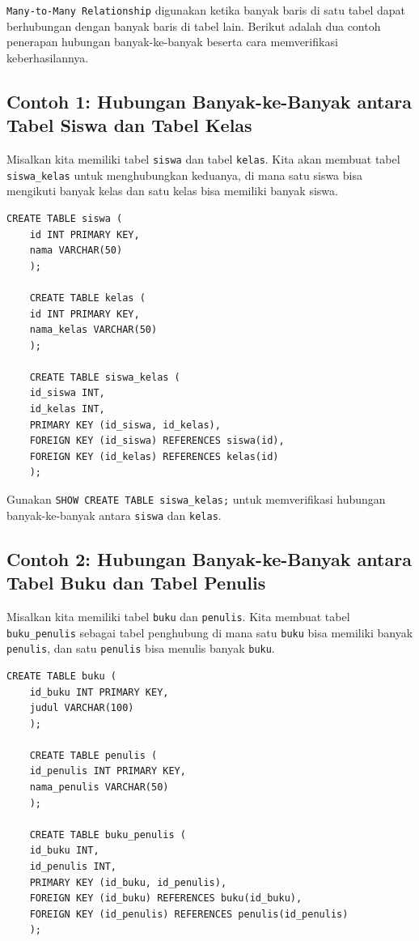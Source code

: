 \texttt{Many-to-Many Relationship} digunakan ketika banyak baris di satu tabel dapat berhubungan dengan banyak baris di tabel lain. Berikut adalah dua contoh penerapan hubungan banyak-ke-banyak beserta cara memverifikasi keberhasilannya.

\subsection*{Contoh 1: Hubungan Banyak-ke-Banyak antara Tabel Siswa dan Tabel Kelas}
Misalkan kita memiliki tabel \texttt{siswa} dan tabel \texttt{kelas}. Kita akan membuat tabel \texttt{siswa\_kelas} untuk menghubungkan keduanya, di mana satu siswa bisa mengikuti banyak kelas dan satu kelas bisa memiliki banyak siswa.

\begin{lstlisting}[style=sql]
	CREATE TABLE siswa (
	id INT PRIMARY KEY,
	nama VARCHAR(50)
	);
	
	CREATE TABLE kelas (
	id INT PRIMARY KEY,
	nama_kelas VARCHAR(50)
	);
	
	CREATE TABLE siswa_kelas (
	id_siswa INT,
	id_kelas INT,
	PRIMARY KEY (id_siswa, id_kelas),
	FOREIGN KEY (id_siswa) REFERENCES siswa(id),
	FOREIGN KEY (id_kelas) REFERENCES kelas(id)
	);
\end{lstlisting}

Gunakan \texttt{SHOW CREATE TABLE siswa\_kelas;} untuk memverifikasi hubungan banyak-ke-banyak antara \texttt{siswa} dan \texttt{kelas}.

\subsection*{Contoh 2: Hubungan Banyak-ke-Banyak antara Tabel Buku dan Tabel Penulis}
Misalkan kita memiliki tabel \texttt{buku} dan \texttt{penulis}. Kita membuat tabel \texttt{buku\_penulis} sebagai tabel penghubung di mana satu \texttt{buku} bisa memiliki banyak \texttt{penulis}, dan satu \texttt{penulis} bisa menulis banyak \texttt{buku}.

\begin{lstlisting}[style=sql]
	CREATE TABLE buku (
	id_buku INT PRIMARY KEY,
	judul VARCHAR(100)
	);
	
	CREATE TABLE penulis (
	id_penulis INT PRIMARY KEY,
	nama_penulis VARCHAR(50)
	);
	
	CREATE TABLE buku_penulis (
	id_buku INT,
	id_penulis INT,
	PRIMARY KEY (id_buku, id_penulis),
	FOREIGN KEY (id_buku) REFERENCES buku(id_buku),
	FOREIGN KEY (id_penulis) REFERENCES penulis(id_penulis)
	);
\end{lstlisting}

